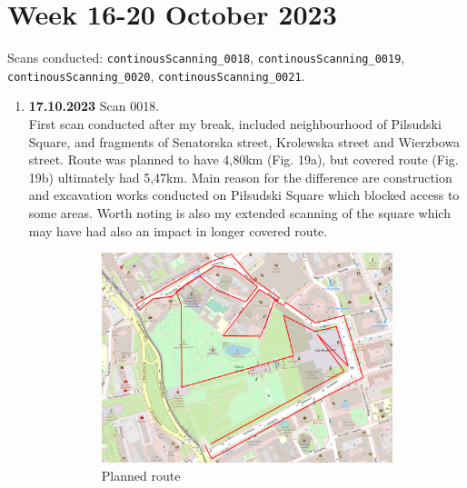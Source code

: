 \documentclass[a4paper,12pt]{book}
\begin{document}
\section{Week 16-20 October 2023}
Scans conducted: \verb|continousScanning_0018|, \verb|continousScanning_0019|, \verb|continousScanning_0020|, \verb|continousScanning_0021|.\\
\begin{enumerate}
	\item \textbf{17.10.2023} Scan 0018. \\
	First scan conducted after my break, included neighbourhood of Pilsudski Square, and fragments of Senatorska street, Krolewska street and Wierzbowa street. Route was planned to have 4,80km (Fig. 19a), but covered route (Fig. 19b) ultimately had 5,47km. Main reason for the difference are construction and excavation works conducted on Piłsudski Square which blocked access to some areas. Worth noting is also my extended scanning of the square which may have had also an impact in longer covered route.
	\begin{figure}[H]
		\centering
		\begin{subfigure}{.95\textwidth}
			\centering
			\includegraphics[width=1\linewidth]{route_p18}
			\caption{Planned route}
			\label{fig:a18}
		\end{subfigure}%
		\linebreak
		\begin{subfigure}{.95\textwidth}
			\centering

\end{subfigure}
\end{figure}
\end{enumerate}
\end{document}

